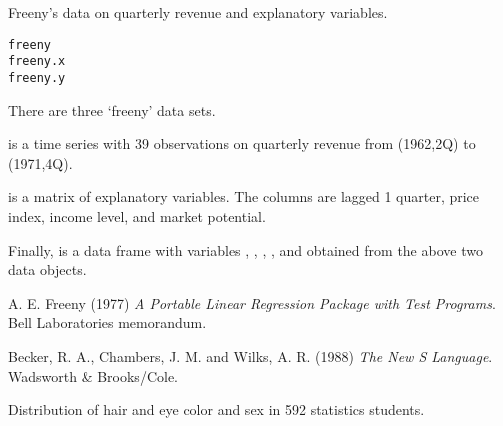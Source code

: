 %
\begin{Description}\relax
Freeny's data on quarterly revenue and explanatory variables.
\end{Description}
%
\begin{Usage}
\begin{verbatim}
freeny
freeny.x
freeny.y
\end{verbatim}
\end{Usage}
%
\begin{Format}
There are three `freeny' data sets.

 is a time series with 39 observations on quarterly
revenue from (1962,2Q) to (1971,4Q).

 is a matrix of explanatory variables.  The columns
are  lagged 1 quarter, price index, income level, and
market potential.

Finally,  is a data frame with variables ,
, , ,
and  obtained from the above two data objects.
\end{Format}
%
\begin{Source}\relax
A. E. Freeny (1977)
\emph{A Portable Linear Regression Package with Test Programs}.
Bell Laboratories memorandum.
\end{Source}
%
\begin{References}\relax
Becker, R. A., Chambers, J. M. and Wilks, A. R. (1988)
\emph{The New S Language}.
Wadsworth \& Brooks/Cole.
\end{References}
%
\begin{Examples}
\end{Examples}
%
\begin{Description}\relax
Distribution of hair and eye color and sex in 592 statistics students.
\end{Description}
